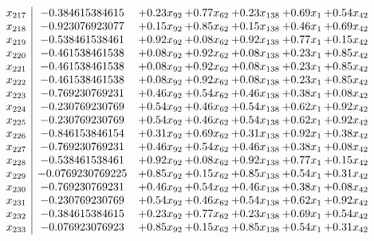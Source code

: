 \documentclass[8pt]{article}
\begin{document}
\[\begin{array}{c| c c@{\hskip 2pt} c@{\hskip 2pt} c@{\hskip 2pt} c@{\hskip 2pt} c@{\hskip 2pt} }
 x_{217}   &  -0.384615384615 & +  0.23 x_{92} & +  0.77 x_{62} & +  0.23 x_{138} & +  0.69 x_{1} & +  0.54 x_{42}\\
 x_{218}   &  -0.923076923077 & +  0.15 x_{92} & +  0.85 x_{62} & +  0.15 x_{138} & +  0.46 x_{1} & +  0.69 x_{42}\\
 x_{219}   &  -0.538461538461 & +  0.92 x_{92} & +  0.08 x_{62} & +  0.92 x_{138} & +  0.77 x_{1} & +  0.15 x_{42}\\
 x_{220}   &  -0.461538461538 & +  0.08 x_{92} & +  0.92 x_{62} & +  0.08 x_{138} & +  0.23 x_{1} & +  0.85 x_{42}\\
 x_{221}   &  -0.461538461538 & +  0.08 x_{92} & +  0.92 x_{62} & +  0.08 x_{138} & +  0.23 x_{1} & +  0.85 x_{42}\\
 x_{222}   &  -0.461538461538 & +  0.08 x_{92} & +  0.92 x_{62} & +  0.08 x_{138} & +  0.23 x_{1} & +  0.85 x_{42}\\
 x_{223}   &  -0.769230769231 & +  0.46 x_{92} & +  0.54 x_{62} & +  0.46 x_{138} & +  0.38 x_{1} & +  0.08 x_{42}\\
 x_{224}   &  -0.230769230769 & +  0.54 x_{92} & +  0.46 x_{62} & +  0.54 x_{138} & +  0.62 x_{1} & +  0.92 x_{42}\\
 x_{225}   &  -0.230769230769 & +  0.54 x_{92} & +  0.46 x_{62} & +  0.54 x_{138} & +  0.62 x_{1} & +  0.92 x_{42}\\
 x_{226}   &  -0.846153846154 & +  0.31 x_{92} & +  0.69 x_{62} & +  0.31 x_{138} & +  0.92 x_{1} & +  0.38 x_{42}\\
 x_{227}   &  -0.769230769231 & +  0.46 x_{92} & +  0.54 x_{62} & +  0.46 x_{138} & +  0.38 x_{1} & +  0.08 x_{42}\\
 x_{228}   &  -0.538461538461 & +  0.92 x_{92} & +  0.08 x_{62} & +  0.92 x_{138} & +  0.77 x_{1} & +  0.15 x_{42}\\
 x_{229}   &  -0.0769230769225 & +  0.85 x_{92} & +  0.15 x_{62} & +  0.85 x_{138} & +  0.54 x_{1} & +  0.31 x_{42}\\
 x_{230}   &  -0.769230769231 & +  0.46 x_{92} & +  0.54 x_{62} & +  0.46 x_{138} & +  0.38 x_{1} & +  0.08 x_{42}\\
 x_{231}   &  -0.230769230769 & +  0.54 x_{92} & +  0.46 x_{62} & +  0.54 x_{138} & +  0.62 x_{1} & +  0.92 x_{42}\\
 x_{232}   &  -0.384615384615 & +  0.23 x_{92} & +  0.77 x_{62} & +  0.23 x_{138} & +  0.69 x_{1} & +  0.54 x_{42}\\
 x_{233}   &  -0.076923076923 & +  0.85 x_{92} & +  0.15 x_{62} & +  0.85 x_{138} & +  0.54 x_{1} & +  0.31 x_{42}\\

\end{array}\]
\end{document}
